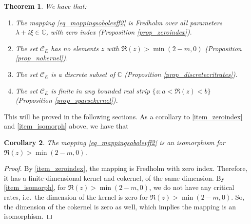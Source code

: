 \documentclass[10pt, a4paper]{article}
\theoremstyle{plain}%
\newtheorem{theorem}{Theorem}[section]
\newtheorem{coro}[theorem]{Corollary}
\theoremstyle{definition}
\numberwithin{figure}{section}
\numberwithin{equation}{section}
\newcommand{\bC}{\mathbb{C}}
\newcommand{\cC}{\mathcal{C}}
\begin{document}
\begin{theorem}\label{thm_mappingff}
	We have that:
	\begin{enumerate}[label=(\alph*)]
		\item\label{item_zeroindex} The mapping \eqref{eq_mappingsobolevff2} is Fredholm over all parameters $\lambda + i\xi \in \bC$, with zero index (Proposition \ref{prop_zeroindex}).
		 
		\item\label{item_isomorph} The set $\cC_E$ has no elements $z$ with $\Re(z)>\min(2-m,0)$ (Proposition \ref{prop_nokernel}).
		\item\label{item_sparsekernel} The set $\cC_E$ is a discrete subset of $\bC$ (Proposition \ref{prop_discretecritrates}).
		\item\label{item_finitestrip} The set $\cC_E$ is finite in any bounded real strip $\{z : a < \Re(z) < b\}$ (Proposition \ref{prop_sparsekernel}).
	\end{enumerate}
\end{theorem}
This will be proved in the following sections. As a corollary to \ref{item_zeroindex} and \ref{item_isomorph} above, we have that 
\begin{coro}
	The mapping \eqref{eq_mappingsobolevff2} is an isomorphism for $\Re(z)>\min(2-m,0)$.
\end{coro}
\begin{proof}
	By \ref{item_zeroindex}, the mapping is Fredholm with zero index. Therefore, it has a finite-dimensional kernel and cokernel, of the same dimension. By \ref{item_isomorph}, for $\Re(z)>\min(2-m,0)$, we do not have any critical rates, i.e.\ the dimension of the kernel is zero for $\Re(z)>\min(2-m,0)$. So, the dimension of the cokernel is zero as well, which implies the mapping is an isomorphism.
\end{proof}
\end{document}
